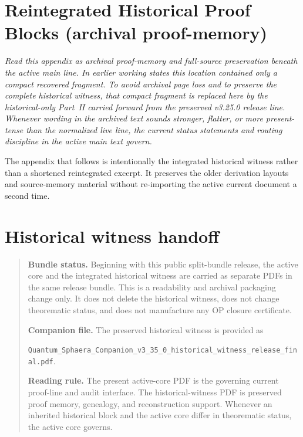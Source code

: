 \section{Reintegrated Historical Proof Blocks (archival proof-memory)}
\label{app:formal-reintegrated}

\textit{Read this appendix as archival proof-memory and full-source preservation beneath the active main line. In earlier working states this location contained only a compact recovered fragment. To avoid archival page loss and to preserve the complete historical witness, that compact fragment is replaced here by the historical-only Part~II carried forward from the preserved v3.25.0 release line. Whenever wording in the archived text sounds stronger, flatter, or more present-tense than the normalized live line, the current status statements and routing discipline in the active main text govern.}

\begin{remark}
The appendix that follows is intentionally the integrated historical witness rather than a shortened reintegrated excerpt. It preserves the older derivation layouts and source-memory material without re-importing the active current document a second time.
\end{remark}


\clearpage
\section*{Historical witness handoff}
\begin{quote}\small
\noindent\textbf{Bundle status.} Beginning with this public split-bundle release, the active core and the integrated historical witness are carried as separate PDFs in the same release bundle. This is a readability and archival packaging change only. It does not delete the historical witness, does not change theorematic status, and does not manufacture any OP closure certificate.

\medskip
\noindent\textbf{Companion file.} The preserved historical witness is provided as\par
\texttt{Quantum\_Sphaera\_Companion\_v3\_35\_0\_historical\_witness\_release\_final.pdf}.

\medskip
\noindent\textbf{Reading rule.} The present active-core PDF is the governing current proof-line and audit interface. The historical-witness PDF is preserved proof memory, genealogy, and reconstruction support. Whenever an inherited historical block and the active core differ in theorematic status, the active core governs.
\end{quote}

